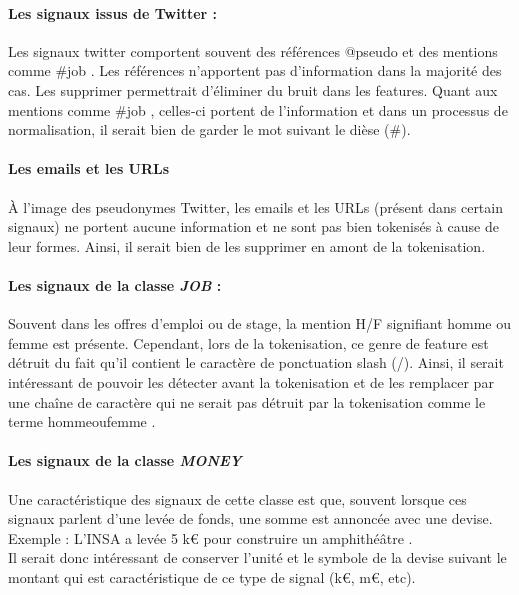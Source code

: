                 \paragraph{Les signaux issus de Twitter :}
                    Les signaux twitter comportent souvent des références \og @pseudo \fg et des mentions comme \og \#job \fg. Les références n'apportent pas d'information dans la majorité des cas. Les supprimer permettrait d’éliminer du bruit dans les features. Quant aux mentions comme \og \#job \fg, celles-ci portent de l'information et dans un processus de normalisation, il serait bien de garder le mot suivant le dièse (\#).

                \paragraph{Les emails et les URLs}
                    À l'image des pseudonymes Twitter, les emails et les URLs (présent dans certain signaux) ne portent aucune information et ne sont pas bien tokenisés à cause de leur formes. Ainsi, il serait bien de les supprimer en amont de la tokenisation.

                \paragraph{Les signaux de la classe \textit {JOB} :}
                    Souvent dans les offres d'emploi ou de stage, la mention \og H/F \fg signifiant \og homme ou femme \fg est présente. Cependant, lors de la tokenisation, ce genre de feature est détruit du fait qu'il contient le caractère de ponctuation slash (/). Ainsi, il serait intéressant de pouvoir les détecter avant la tokenisation et de les remplacer par une chaîne de caractère qui ne serait pas détruit par la tokenisation comme le terme \og hommeoufemme \fg.

                \paragraph{Les signaux de la classe \textit{MONEY}}
                    Une caractéristique des signaux de cette classe est que, souvent lorsque ces signaux parlent d'une levée de fonds, une somme est annoncée avec une devise. Exemple : \og L'INSA a levée 5 k€ pour construire un amphithéâtre \fg.\\
                    Il serait donc intéressant de conserver l'unité et le symbole de la devise suivant le montant qui est caractéristique de ce type de signal (k€, m€, etc).

